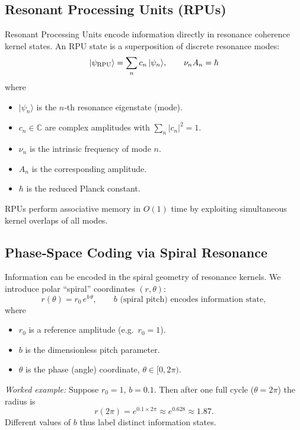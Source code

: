 \subsection{Resonant Processing Units (RPUs)}

Resonant Processing Units encode information directly in resonance coherence kernel states.  An RPU state is a superposition of discrete resonance modes:
\begin{equation}
  \lvert\psi_{\rm RPU}\rangle
  = \sum_{n} c_{n}\,\lvert\psi_{n}\rangle,
  \qquad
  \nu_{n} A_{n} = \hbar
  \label{eq:RPU_state}
\end{equation}
where
\begin{itemize}
  \item $\lvert\psi_{n}\rangle$ is the $n$‐th resonance eigenstate (mode).
  \item $c_{n}\in\mathbb{C}$ are complex amplitudes with $\sum_n|c_n|^2=1$.
  \item $\nu_{n}$ is the intrinsic frequency of mode $n$.
  \item $A_{n}$ is the corresponding amplitude.
  \item $\hbar$ is the reduced Planck constant.
\end{itemize}
RPUs perform associative memory in $O(1)$ time by exploiting simultaneous kernel overlaps of all modes.

\subsection{Phase‐Space Coding via Spiral Resonance}

Information can be encoded in the spiral geometry of resonance kernels.  We introduce polar “spiral” coordinates $(r,\theta)$:
\begin{equation}
  r(\theta) = r_{0}\,e^{b\,\theta},
  \qquad
  b \text{ (spiral pitch) encodes information state},
  \label{eq:spiral_coord}
\end{equation}
where
\begin{itemize}
  \item $r_{0}$ is a reference amplitude (e.g.\ $r_{0}=1$).
  \item $b$ is the dimensionless pitch parameter.
  \item $\theta$ is the phase (angle) coordinate, $\theta\in[0,2\pi)$.
\end{itemize}
\emph{Worked example:} Suppose $r_{0}=1$, $b=0.1$.  Then after one full cycle ($\theta=2\pi$) the radius is
\[
  r(2\pi) = e^{0.1\times2\pi} \approx e^{0.628} \approx 1.87.
\]
Different values of $b$ thus label distinct information states.

